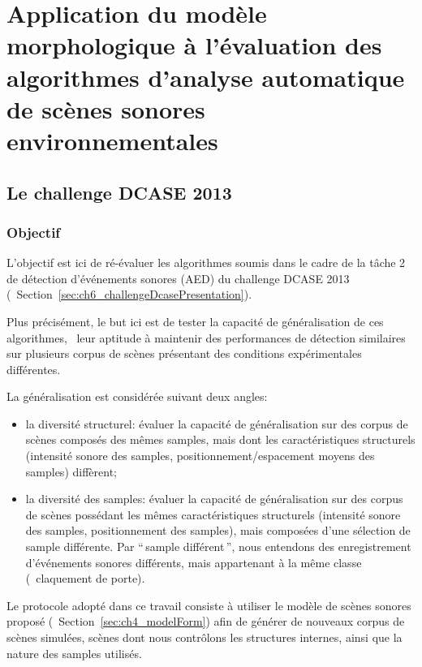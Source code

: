 \chapter[Application du modèle à l'évaluation]{Application du modèle morphologique à l'évaluation des algorithmes d'analyse automatique de scènes sonores environnementales}\label{ch:ml_simuperf}

\section{Le challenge DCASE  2013}

\subsection{Objectif}

L'objectif est ici de ré-évaluer les algorithmes soumis dans le cadre de la tâche 2 de détection d'événements sonores (AED) du challenge DCASE 2013 (\cf~Section~\ref{sec:ch6_challengeDcasePresentation}). 

Plus précisément, le but ici est de tester la capacité de généralisation de ces algorithmes, \ie~leur aptitude à maintenir des performances de détection similaires sur plusieurs corpus de scènes présentant des conditions expérimentales différentes.

La généralisation est considérée suivant deux angles:

\begin{itemize}
\item la diversité structurel: évaluer la capacité de généralisation sur des corpus de scènes composés des mêmes samples, mais dont les caractéristiques structurels (intensité sonore des samples, positionnement/espacement moyens des samples) diffèrent;
\item la diversité des samples: évaluer la capacité de généralisation sur des corpus de scènes possédant les mêmes caractéristiques structurels (intensité sonore des samples, positionnement des samples), mais composées d'une sélection de sample différente. Par ``\,sample différent\,'', nous entendons des enregistrement d'événements sonores différents, mais appartenant à la même classe (\eg~claquement de porte). 
\end{itemize}

Le protocole adopté dans ce travail consiste à utiliser le modèle de scènes sonores proposé (\cf~Section~\ref{sec:ch4_modelForm}) afin de générer de nouveaux corpus de scènes simulées, scènes dont nous contrôlons les structures internes, ainsi que la nature des samples utilisés. 

